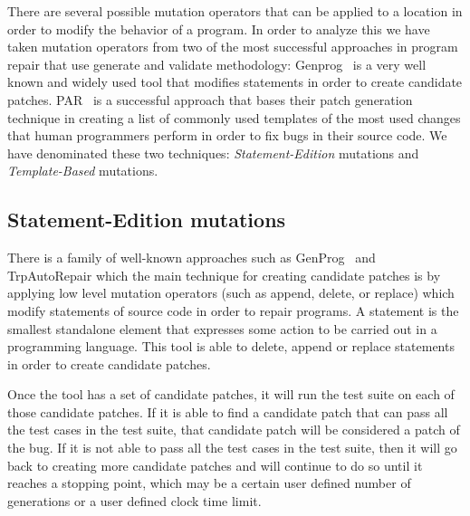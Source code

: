 \documentclass[conference]{IEEEtran}
\begin{document}
There are several possible mutation operators that can be applied to a location 
in order to modify the behavior of a program. In order to analyze this we have 
taken mutation operators from two of the most successful approaches in program 
repair that use generate and validate methodology: Genprog~\cite{legoues12} is a very well known and widely used tool that modifies 
statements in order to create candidate patches. PAR~\cite{kim2013} is a 
successful approach that bases their patch generation technique in creating a 
list of commonly used templates of the most used changes that human programmers 
perform in order to fix bugs in their source code. We have denominated these two 
techniques: \textit{Statement-Edition} mutations 
and \textit{Template-Based} mutations.



\subsection{Statement-Edition mutations}
There is a family of well-known approaches such as GenProg~\cite{legoues12} and 
TrpAutoRepair\cite{QiYuhua13} which the main technique for creating candidate 
patches is by applying low level mutation operators (such as append, delete, or 
replace) which modify statements of source code in order to 
repair programs. A statement is the smallest standalone element that expresses 
some action to be carried out in a programming language. This tool is able to 
delete, append or replace statements in order to create candidate patches.

Once the tool has a set of candidate patches, it will run the test suite on each 
of those candidate patches. If it is able to find a candidate patch that can 
pass all the test cases in the test suite, that candidate patch will be 
considered a patch of the bug. If it is not able to pass all the test cases in 
the test suite, then it will go back to creating more candidate patches and will 
continue to do so until it reaches a stopping point, which may be a certain user 
defined number of generations or a user defined clock time limit.
\end{document}
